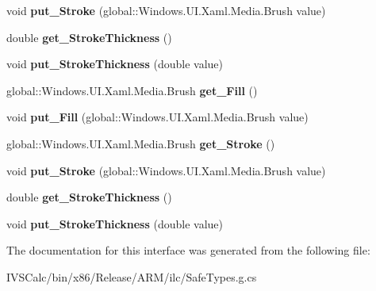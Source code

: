 \begin{DoxyCompactItemize}
void {\bfseries put\+\_\+\+Stroke} (global\+::\+Windows.\+U\+I.\+Xaml.\+Media.\+Brush value)
\item 
\mbox{\label{interface_windows_1_1_u_i_1_1_xaml_1_1_shapes_1_1_i_shape_a6d613bc0441546b161b5e37a3ad670bb}} 
double {\bfseries get\+\_\+\+Stroke\+Thickness} ()
\item 
\mbox{\label{interface_windows_1_1_u_i_1_1_xaml_1_1_shapes_1_1_i_shape_af9a5cdb73397a297f29adca4e3eb36fd}} 
void {\bfseries put\+\_\+\+Stroke\+Thickness} (double value)
\item 
\mbox{\label{interface_windows_1_1_u_i_1_1_xaml_1_1_shapes_1_1_i_shape_af4e42d9485e6d268e44504c627789501}} 
global\+::\+Windows.\+U\+I.\+Xaml.\+Media.\+Brush {\bfseries get\+\_\+\+Fill} ()
\item 
\mbox{\label{interface_windows_1_1_u_i_1_1_xaml_1_1_shapes_1_1_i_shape_a95f26341489f0a5b4fb33bc70d6a42ee}} 
void {\bfseries put\+\_\+\+Fill} (global\+::\+Windows.\+U\+I.\+Xaml.\+Media.\+Brush value)
\item 
\mbox{\label{interface_windows_1_1_u_i_1_1_xaml_1_1_shapes_1_1_i_shape_a750991e7e91011576e9bf0089176dab9}} 
global\+::\+Windows.\+U\+I.\+Xaml.\+Media.\+Brush {\bfseries get\+\_\+\+Stroke} ()
\item 
\mbox{\label{interface_windows_1_1_u_i_1_1_xaml_1_1_shapes_1_1_i_shape_ad644072c65741324450d8ae05a6c187b}} 
void {\bfseries put\+\_\+\+Stroke} (global\+::\+Windows.\+U\+I.\+Xaml.\+Media.\+Brush value)
\item 
\mbox{\label{interface_windows_1_1_u_i_1_1_xaml_1_1_shapes_1_1_i_shape_a6d613bc0441546b161b5e37a3ad670bb}} 
double {\bfseries get\+\_\+\+Stroke\+Thickness} ()
\item 
\mbox{\label{interface_windows_1_1_u_i_1_1_xaml_1_1_shapes_1_1_i_shape_af9a5cdb73397a297f29adca4e3eb36fd}} 
void {\bfseries put\+\_\+\+Stroke\+Thickness} (double value)
\end{DoxyCompactItemize}


The documentation for this interface was generated from the following file\+:\begin{DoxyCompactItemize}
\item 
I\+V\+S\+Calc/bin/x86/\+Release/\+A\+R\+M/ilc/Safe\+Types.\+g.\+cs\end{DoxyCompactItemize}
